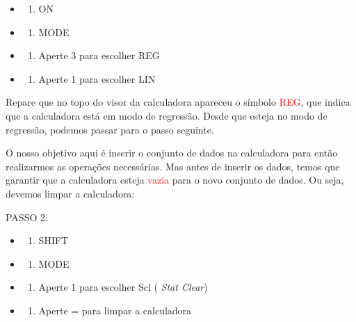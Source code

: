 \documentclass[
]{book}
\providecommand{\tightlist}{%
  \setlength{\itemsep}{0pt}\setlength{\parskip}{0pt}}
\begin{document}
\begin{itemize}
\item
  \begin{enumerate}
  \def\labelenumi{\arabic{enumi}.}
  \tightlist
  \item
    ON
  \end{enumerate}
\item
  \begin{enumerate}
  \def\labelenumi{\arabic{enumi}.}
  \setcounter{enumi}{1}
  \tightlist
  \item
    MODE
  \end{enumerate}
\item
  \begin{enumerate}
  \def\labelenumi{\arabic{enumi}.}
  \setcounter{enumi}{2}
  \tightlist
  \item
    Aperte 3 para escolher REG
  \end{enumerate}
\item
  \begin{enumerate}
  \def\labelenumi{\arabic{enumi}.}
  \setcounter{enumi}{3}
  \tightlist
  \item
    Aperte 1 para escolher LIN
  \end{enumerate}
\end{itemize}

Repare que no topo do visor da calculadora apareceu o símbolo \textcolor{red}{REG}, que indica que a calculadora está em modo de regressão. Desde que esteja no modo de regressão, podemos passar para o passo seguinte.

O nosso objetivo aqui é inserir o conjunto de dados na calculadora para então realizarmos as operações necessárias. Mas antes de inserir os dados, temos que garantir que a calculadora esteja \textcolor{red}{vazia} para o novo conjunto de dados. Ou seja, devemos limpar a calculadora:

PASSO 2:

\begin{itemize}
\item
  \begin{enumerate}
  \def\labelenumi{\arabic{enumi}.}
  \tightlist
  \item
    SHIFT
  \end{enumerate}
\item
  \begin{enumerate}
  \def\labelenumi{\arabic{enumi}.}
  \setcounter{enumi}{1}
  \tightlist
  \item
    MODE
  \end{enumerate}
\item
  \begin{enumerate}
  \def\labelenumi{\arabic{enumi}.}
  \setcounter{enumi}{2}
  \tightlist
  \item
    Aperte 1 para escolher Scl ( \emph{Stat Clear})
  \end{enumerate}
\item
  \begin{enumerate}
  \def\labelenumi{\arabic{enumi}.}
  \setcounter{enumi}{3}
  \tightlist
  \item
    Aperte = para limpar a calculadora
  \end{enumerate}
\end{itemize}
\end{document}
